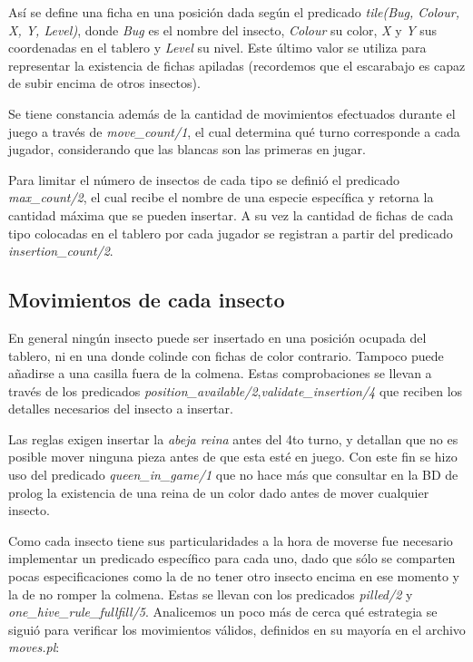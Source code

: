 \documentclass[runningheads,a4paper]{llncs}
\begin{document}
As\'i se define una ficha en una posici\'on dada seg\'un el predicado \emph{tile(Bug, Colour, X, Y, Level)}, donde \emph{Bug} es el nombre del insecto, \emph{Colour} su color, \emph{X} y \emph{Y} sus coordenadas en el tablero y \emph{Level} su nivel. Este \'ultimo valor se utiliza para representar la existencia de fichas apiladas (recordemos que el escarabajo es capaz de subir encima de otros insectos). 

Se tiene constancia adem\'as de la cantidad de movimientos efectuados durante el juego a trav\'es de \emph{move\_count/1}, el cual determina qu\'e turno corresponde a cada jugador, considerando que las blancas son las primeras en jugar.

Para limitar el n\'umero de insectos de cada tipo se defini\'o el predicado \emph{max\_count/2}, el cual recibe el nombre de una especie espec\'ifica y retorna la cantidad m\'axima que se pueden insertar. A su vez la cantidad de fichas de cada tipo colocadas en el tablero por cada jugador se registran a partir del predicado \emph{insertion\_count/2}.

\subsection{Movimientos de cada insecto}

En general ning\'un insecto puede ser insertado en una posici\'on ocupada del tablero, ni en una donde colinde con fichas de color contrario. Tampoco puede a\~nadirse a una casilla fuera de la colmena. Estas comprobaciones se llevan a trav\'es de los predicados \emph{position\_available/2},\emph{validate\_insertion/4} que reciben los detalles necesarios del insecto a insertar.

Las reglas exigen insertar la \emph{abeja reina} antes del 4to turno, y detallan que no es posible mover ninguna pieza antes de que esta est\'e en juego. Con este fin se hizo uso del predicado \emph{queen\_in\_game/1} que no hace m\'as que consultar en la BD de prolog la existencia de una reina de un color dado antes de mover cualquier insecto. 

Como cada insecto tiene sus particularidades a la hora de moverse fue necesario implementar un predicado espec\'ifico para cada uno, dado que s\'olo se comparten pocas especificaciones como la de no tener otro insecto encima en ese momento y la de no romper la colmena. Estas se llevan con los predicados \emph{pilled/2} y \emph{one\_hive\_rule\_fullfill/5}. Analicemos un poco m\'as de cerca qu\'e estrategia se sigui\'o para verificar los movimientos v\'alidos, definidos en su mayor\'ia en el archivo \emph{moves.pl}:
\end{document}
